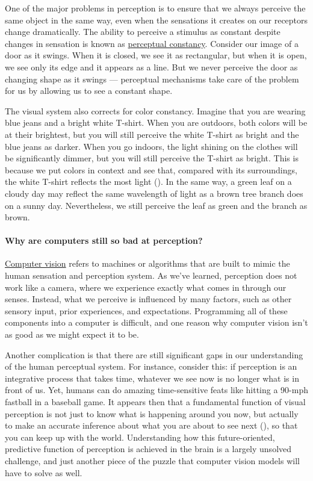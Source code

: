 \documentclass[
]{krantz}
\begin{document}
One of the major problems in perception is to ensure that we always perceive the same object in the same way, even when the sensations it creates on our receptors change dramatically. The ability to perceive a stimulus as constant despite changes in sensation is known as \hyperref[perceptual-constancy]{perceptual constancy}. Consider our image of a door as it swings. When it is closed, we see it as rectangular, but when it is open, we see only its edge and it appears as a line. But we never perceive the door as changing shape as it swings --- perceptual mechanisms take care of the problem for us by allowing us to see a constant shape.

The visual system also corrects for color constancy. Imagine that you are wearing blue jeans and a bright white T-shirt. When you are outdoors, both colors will be at their brightest, but you will still perceive the white T-shirt as bright and the blue jeans as darker. When you go indoors, the light shining on the clothes will be significantly dimmer, but you will still perceive the T-shirt as bright. This is because we put colors in context and see that, compared with its surroundings, the white T-shirt reflects the most light (). In the same way, a green leaf on a cloudy day may reflect the same wavelength of light as a brown tree branch does on a sunny day. Nevertheless, we still perceive the leaf as green and the branch as brown.

\paragraph*{Why are computers still so bad at perception?}\label{why-are-computers-still-so-bad-at-perception}

\hyperref[computer-vision]{Computer vision} refers to machines or algorithms that are built to mimic the human sensation and perception system. As we've learned, perception does not work like a camera, where we experience exactly what comes in through our senses. Instead, what we perceive is influenced by many factors, such as other sensory input, prior experiences, and expectations. Programming all of these components into a computer is difficult, and one reason why computer vision isn't as good as we might expect it to be.

Another complication is that there are still significant gaps in our understanding of the human perceptual system. For instance, consider this: if perception is an integrative process that takes time, whatever we see now is no longer what is in front of us. Yet, humans can do amazing time-sensitive feats like hitting a 90-mph fastball in a baseball game. It appears then that a fundamental function of visual perception is not just to know what is happening around you now, but actually to make an accurate inference about what you are about to see next (), so that you can keep up with the world. Understanding how this future-oriented, predictive function of perception is achieved in the brain is a largely unsolved challenge, and just another piece of the puzzle that computer vision models will have to solve as well.
\end{document}
